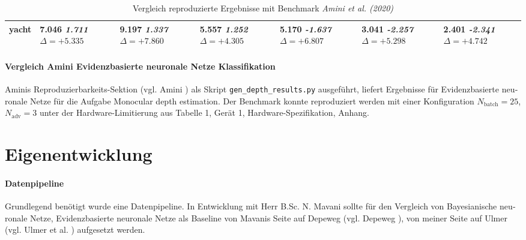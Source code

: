 \begin{otherlanguage}{ngerman}
\begin{table*}[!htbp]
\begin{tabularx}{\textwidth}{|l|X|X|X|X|X|X|}
yacht 
& 7.046 \newline \textit{1.711} \newline \mbox{$\Delta=+5.335$} 
& 9.197 \newline \textit{1.337} \newline \mbox{$\Delta=+7.860$} 
& 5.557 \newline \textit{1.252} \newline \mbox{$\Delta=+4.305$} 
& 5.170 \newline \textit{-1.637} \newline \mbox{$\Delta=+6.807$} 
& 3.041 \newline \textit{-2.257} \newline \mbox{$\Delta=+5.298$} 
& 2.401 \newline \textit{-2.341} \newline \mbox{$\Delta=+4.742$} \\ \hline
\end{tabularx}
\caption{Vergleich reproduzierte Ergebnisse mit Benchmark \textit{Amini et al. (2020)}}
\label{tab:comparison_ours_vs_amini_tabularx_v3}
\end{table*}


\paragraph{Vergleich Amini \gls{Evidenzbasierte neuronale Netze} Klassifikation} Aminis Reproduzierbarkeits-Sektion (vgl. Amini \parencite{amini2020deep}) als Skript \texttt{gen\_depth\_results.py} ausgeführt, liefert Ergebnisse für \gls{Evidenzbasierte neuronale Netze} für die Aufgabe \glqq Monocular depth estimation\grqq. Der Benchmark konnte reproduziert werden mit einer Konfiguration $N_\text{batch}=25$, $N_\text{adv}=3$ unter der Hardware-Limitierung aus Tabelle 1, Gerät 1, Hardware-Spezifikation, Anhang. %



\section*{Eigenentwicklung}

\paragraph{Datenpipeline} Grundlegend benötigt wurde eine Datenpipeline. In Entwicklung mit Herr B.Sc. N. Mavani sollte für den Vergleich von \gls{Bayesianische neuronale Netze}, \gls{Evidenzbasierte neuronale Netze} als Baseline von Mavanis Seite auf Depeweg (vgl. Depeweg \parencite{Depeweg2019}), von meiner Seite auf Ulmer (vgl. Ulmer et al. \parencite{Ulmer2023}) aufgesetzt werden.


\end{otherlanguage}
